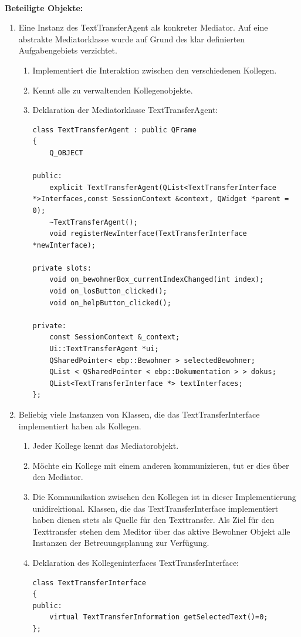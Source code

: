 \\
\textbf{Beteiligte Objekte\cite[S. 277]{Entwurfsmuster}:}
\begin{enumerate}
	\item Eine Instanz des TextTransferAgent als konkreter Mediator. Auf eine abstrakte Mediatorklasse wurde auf Grund des klar definierten Aufgabengebiets verzichtet.
	\begin{enumerate}
		\item Implementiert die Interaktion zwischen den verschiedenen Kollegen.
		\item Kennt alle zu verwaltenden Kollegenobjekte.
		\item Deklaration der Mediatorklasse TextTransferAgent:
		\begin{lstlisting}
class TextTransferAgent : public QFrame
{
    Q_OBJECT

public:
    explicit TextTransferAgent(QList<TextTransferInterface *>Interfaces,const SessionContext &context, QWidget *parent = 0);
    ~TextTransferAgent();
    void registerNewInterface(TextTransferInterface *newInterface);

private slots:
    void on_bewohnerBox_currentIndexChanged(int index);
    void on_losButton_clicked();
    void on_helpButton_clicked();

private:
    const SessionContext &_context;
    Ui::TextTransferAgent *ui;
    QSharedPointer< ebp::Bewohner > selectedBewohner;
    QList < QSharedPointer < ebp::Dokumentation > > dokus;
    QList<TextTransferInterface *> textInterfaces;
};
		\end{lstlisting}
	\end{enumerate}
	\item Beliebig viele Instanzen von Klassen, die das TextTransferInterface implementiert haben als Kollegen.
	\begin{enumerate}
		\item Jeder Kollege kennt das Mediatorobjekt.
		\item Möchte ein Kollege mit einem anderen kommunizieren, tut er dies über den Mediator.
		\item Die Kommunikation zwischen den Kollegen ist in dieser Implementierung unidirektional. Klassen, die das TextTransferInterface implementiert haben dienen stets 
			als Quelle für den Texttransfer. Als Ziel für den Texttransfer stehen dem Meditor über das aktive Bewohner Objekt alle Instanzen der Betreuungsplanung zur Verfügung.
		\item Deklaration des Kollegeninterfaces TextTransferInterface:
		\begin{lstlisting}
class TextTransferInterface
{
public:
    virtual TextTransferInformation getSelectedText()=0;
};
		\end{lstlisting}
	\end{enumerate}
\end{enumerate}
